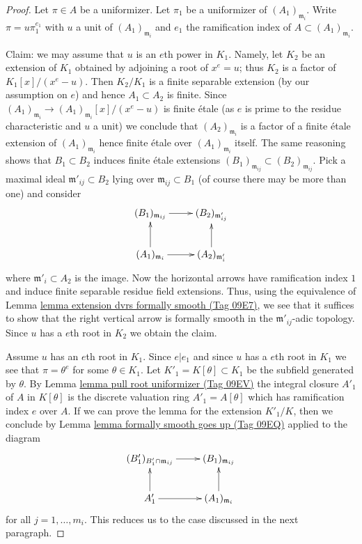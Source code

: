 \documentclass{amsart}
\theoremstyle{plain}
\theoremstyle{definition}
\theoremstyle{remark}
\numberwithin{equation}{subsection}
\begin{document}
\begin{proof}
Let $\pi \in A$ be a uniformizer. Let $\pi_1$ be a uniformizer
of $(A_1)_{\mathfrak m_i}$. Write $\pi = u \pi_1^{e_1}$ with $u$ a unit
of $(A_1)_{\mathfrak m_i}$ and $e_1$ the ramification index of
$A \subset (A_1)_{\mathfrak m_i}$.

\medskip\noindent
Claim: we may assume that $u$ is an $e$th power in $K_1$.
Namely, let $K_2$ be an extension of $K_1$ obtained by
adjoining a root of $x^e = u$; thus $K_2$ is a factor
of $K_1[x]/(x^e - u)$. Then $K_2/K_1$ is a finite
separable extension (by our assumption on $e$)
and hence $A_1 \subset A_2$ is finite.
Since $(A_1)_{\mathfrak m_i} \to (A_1)_{\mathfrak m_i}[x]/(x^e - u)$
is finite \'etale
(as $e$ is prime to the residue characteristic and $u$ a unit)
we conclude that $(A_2)_{\mathfrak m_i}$ is a factor of
a finite \'etale extension of $(A_1)_{\mathfrak m_i}$ hence
finite \'etale over $(A_1)_{\mathfrak m_i}$ itself.
The same reasoning shows that $B_1 \subset B_2$ induces
finite \'etale extensions
$(B_1)_{\mathfrak m_{ij}} \subset (B_2)_{\mathfrak m_{ij}}$.
Pick a maximal ideal $\mathfrak m'_{ij} \subset B_2$
lying over $\mathfrak m_{ij} \subset B_1$
(of course there may be more than one) and consider
$$
\xymatrix{
(B_1)_{\mathfrak m_{ij}} \ar[r] & (B_2)_{\mathfrak m'_{ij}} \\
(A_1)_{\mathfrak m_i} \ar[u] \ar[r] &
(A_2)_{\mathfrak m'_i} \ar[u]
}
$$
where $\mathfrak m'_i \subset A_2$ is the image.
Now the horizontal arrows have ramification index $1$
and induce finite separable residue field extensions.
Thus, using the equivalence of
Lemma \href{https://stacks.math.columbia.edu/tag/09E7}{lemma extension dvrs formally smooth (Tag 09E7)},
we see that it suffices to show that the right vertical
arrow is formally smooth in the $\mathfrak m'_{ij}$-adic topology.
Since $u$ has a $e$th root
in $K_2$ we obtain the claim.

\medskip\noindent
Assume $u$ has an $e$th root in $K_1$.
Since $e | e_1$ and since $u$ has a $e$th root in $K_1$
we see that $\pi = \theta^e$ for some $\theta \in K_1$.
Let $K'_1 = K[\theta] \subset K_1$ be the subfield generated by $\theta$.
By Lemma \href{https://stacks.math.columbia.edu/tag/09EV}{lemma pull root uniformizer (Tag 09EV)} the integral closure $A'_1$
of $A$ in $K[\theta]$ is the discrete valuation ring $A'_1 = A[\theta]$
which has ramification index $e$ over $A$.
If we can prove the lemma for the extension $K'_1/K$,
then we conclude by Lemma \href{https://stacks.math.columbia.edu/tag/09EQ}{lemma formally smooth goes up (Tag 09EQ)}
applied to the diagram
$$
\xymatrix{
(B'_1)_{B'_1 \cap \mathfrak m_{ij}} \ar[r] & (B_1)_{\mathfrak m_{ij}} \\
A'_1 \ar[u] \ar[r] &
(A_1)_{\mathfrak m_i} \ar[u]
}
$$
for all $j = 1, \ldots, m_i$. This reduces us to the case discussed
in the next paragraph.


\end{proof}
\end{document}
